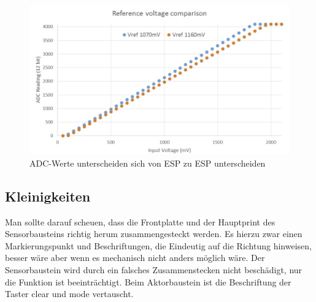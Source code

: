 \begin{figure}[H]
	\centering
	\includegraphics[width=\textwidth]{graphics/ADC_verschieden.png}
	\caption{ADC-Werte unterscheiden sich von ESP zu ESP unterscheiden \cite{noauthor_analog_nodate}}
	\label{pic: different_ADC}
\end{figure}

\subsection{Kleinigkeiten}
Man sollte darauf scheuen, dass die Frontplatte und der Hauptprint des Sensorbausteins richtig herum zusammengesteckt werden. Es hierzu zwar einen Markierungspunkt und Beschriftungen, die Eindeutig auf die Richtung hinweisen, besser wäre aber wenn es mechanisch nicht anders möglich wäre. Der Sensorbaustein wird durch ein falsches Zusammenstecken nicht beschädigt, nur die Funktion ist beeinträchtigt. Beim Aktorbaustein ist die Beschriftung der Taster clear und mode vertauscht.

